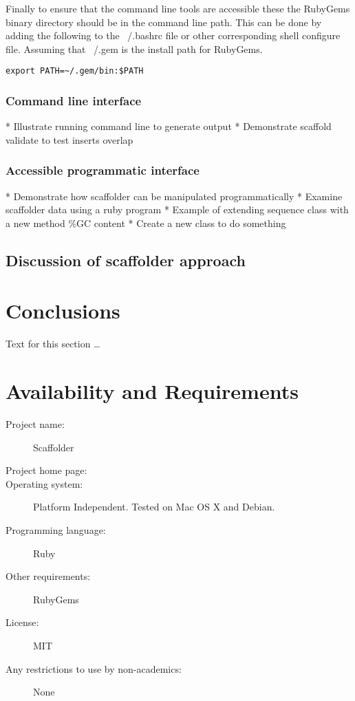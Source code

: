 \documentclass[10pt]{bmc_article}
\newenvironment{bmcformat}{\begin{raggedright}\baselineskip20pt\sloppy\setboolean{publ}{false}}{\end{raggedright}\baselineskip20pt\sloppy}
\begin{document}
\begin{bmcformat}
Finally to ensure that the command line tools are accessible these the
RubyGems binary directory should be in the command line path. This can be done
by adding the following to the ~/.bashrc file or other corresponding shell
configure file. Assuming that ~/.gem is the install path for RubyGems.

\begin{verbatim}
export PATH=~/.gem/bin:$PATH
\end{verbatim}

\subsubsection*{Command line interface} %

  * Illustrate running command line to generate output
  * Demonstrate scaffold validate to test inserts overlap

\subsubsection*{Accessible programmatic interface} %

  * Demonstrate how scaffolder can be manipulated programmatically
  * Examine scaffolder data using a ruby program
  * Example of extending sequence class with a new method \%GC content
  * Create a new class to do something

\subsection*{Discussion of scaffolder approach} %

\section*{Conclusions} %

Text for this section \ldots

\section*{Availability and Requirements} %

  \begin{description}
    \item[Project name:] Scaffolder
    \item[Project home page:] \scaffolder
    \item[Operating system:] Platform Independent. Tested on Mac OS X and
    Debian.
    \item[Programming language:] Ruby
    \item[Other requirements:] RubyGems
    \item[License:] MIT
    \item[Any restrictions to use by non-academics:] None
  \end{description}


\end{bmcformat}
\end{document}
